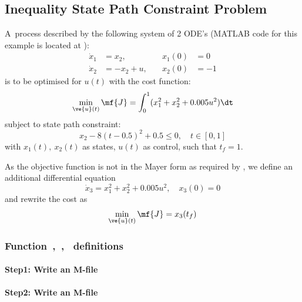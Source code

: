 \subsection{Inequality State Path Constraint Problem}
\label{sec:statepathconprob}

A~process described by the following system of 2
ODE's \citep{jac69,fee98} (MATLAB code for this example is located
at ):
\begin{align}
\dot{x}_1 &= x_{2}, &\quad x_{1}(0) &= 0\\
\dot{x}_2 &= -x_{2} + u, &\quad x_{2}(0) &= -1
\end{align}is to be optimised for $u(t)$ with the cost function:
\begin{equation}
\min_{\ve{u}(t)} \mf{J} = \int_{0}^{1}(x_{1}^{2} + x_{2}^{2} +
0.005u^{2})\dt \label{eq:ispcpa} 
\end{equation} subject to state path constraint:
\begin{equation}
x_{2} - 8(t - 0.5)^{2} + 0.5 \leq 0, \quad t \in [0,1]  
\end{equation} with $x_{1}(t),~x_{2}(t)$ as states, $u(t)$ as control,
such that $t_{f}=1$. 

As the objective function is not in the Mayer form as required by
, we define an additional differential equation
\begin{equation}
\dot{x}_3 =  x_1^2+x_2^2+0.005u^2, \quad x_3(0) = 0
\end{equation}
and rewrite the cost as
\begin{equation} 
\min_{\ve{u}(t)} \mf{J} = x_3(t_f) \label{eq:ispcpb} 
\end{equation}

\subsubsection{Function~,~,~  definitions}
\label{sec:statepathconprob-fundef}

\paragraph{Step1: Write an M-file }

{\small }

\paragraph{Step2: Write an M-file~}


